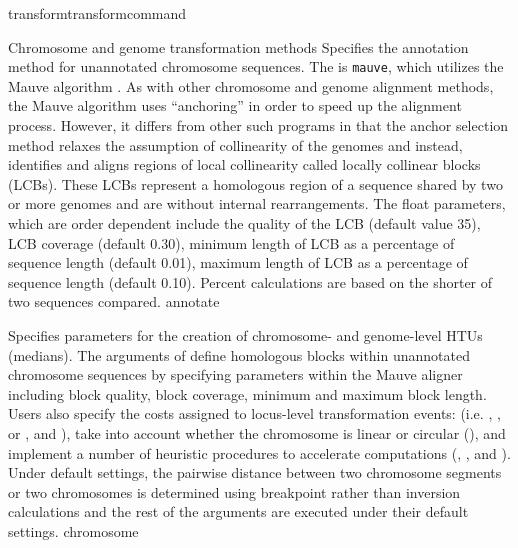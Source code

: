 \begin{command}{transform}{transformcommand}
\begin{arguments}
\begin{argumentgroup}{Chromosome and genome transformation methods}
                {Specifies the annotation \\method for unannotated chromosome 
                sequences. The \poylident is \texttt{mauve}, which utilizes the 
                Mauve algorithm \cite{darlingetal2004}. As with other chromosome 
                and genome alignment methods, the Mauve algorithm uses ``anchoring'' 
                in order to speed up the alignment process. However, it differs from 
                other such programs in that the anchor selection method relaxes 
                the assumption of collinearity of the genomes and instead, identifies 
                and aligns regions of local collinearity called locally collinear 
                blocks (LCBs). These LCBs represent a homologous region 
                of a sequence shared by two or more genomes and are without internal
                rearrangements.  The float parameters, which are order dependent 
                include the quality of the LCB (default value 35), LCB coverage (default 0.30), 
                minimum length of LCB as a percentage of sequence length (default 0.01), 
                maximum length of LCB as a percentage of sequence length (default 0.10).  
                Percent calculations are based on the shorter of two sequences compared.}
                {annotate}
                                    
                {Specifies parameters for the creation of  chro\-mosome- and genome-level 
                HTUs (medians). The arguments of  define 
                homologous blocks within unannotated chromosome sequences by
                specifying parameters within the Mauve aligner \cite{darlingetal2004} 
                including block quality, block coverage, minimum and maximum block
                length. Users also specify the costs assigned to locus-level transformation 
                events: (i.e. , , or 
                , and ), 
                take into account whether the chromosome is linear or circular 
                (), and implement a number of heuristic 
                procedures to accelerate computations (, 
                , and ).  
                Under default settings, the pairwise distance between two chromosome 
                segments or two chromosomes is determined using breakpoint rather 
                than inversion calculations and the rest of the arguments are executed 
                under their default settings.}
                {chromosome}
         

\end{argumentgroup}
\end{arguments}
\end{command}
